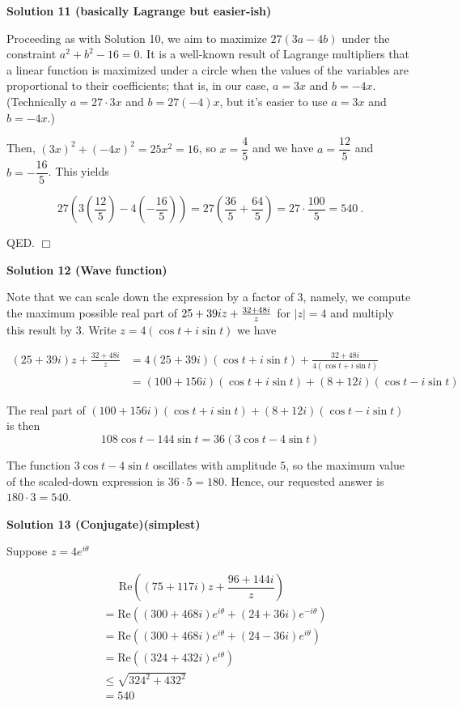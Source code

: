 \begin{enumerate}
 



\textbf{Solution 11 (basically Lagrange but easier-ish)}

Proceeding as with Solution 10, we aim to maximize $27(3a-4b)$ under the constraint $a^2+b^2-16=0$. It is a well-known result of Lagrange multipliers that a linear function is maximized under a circle when the values of the variables are proportional to their coefficients; that is, in our case, $a=3x$ and $b=-4x$. (Technically $a=27\cdot3x$ and $b=27(-4)x$, but it's easier to use $a=3x$ and $b=-4x$.) 

 Then, $(3x)^2+(-4x)^2=25x^2=16$, so $x=\dfrac45$ and we have $a=\dfrac{12}5$ and $b=-\dfrac{16}5$. This yields 

 
 \[27\left(3\left(\dfrac{12}5\right)-4\left(-\dfrac{16}5\right)\right)=27\left(\dfrac{36}5+\dfrac{64}5\right)=27\cdot\dfrac{100}5=\boxed{540}~.\] 

 QED. $\Box$




\textbf{Solution 12 (Wave function)}

Note that we can scale down the expression by a factor of $3$, namely, we compute the maximum possible real part of ${25+39i}z+{32+48i\over z}$ for $|z|=4$ and multiply this result by 3. Write $z=4(\cos t+i\sin t)$ we have

 \begin{align}(25+39i)z + \frac{32+48i}{z}&= 4(25+39i)(\cos t+i\sin t) + \frac{32+48i}{4(\cos t+i\sin t)} \\&= (100+156i)(\cos t+i\sin t) + (8+12i)(\cos t-i\sin t)\end{align}

 The real part of $(100+156i)(\cos t+i\sin t)+(8+12i)(\cos t-i\sin t)$ is then 
 \[108\cos t-144\sin t=36(3\cos t-4\sin t)\]

 The function $3\cos t-4\sin t$ oscillates with amplitude $5$, so the maximum value of the scaled-down expression is $36\cdot 5=180$. Hence, our requested answer is $180\cdot 3=\boxed{540}$.

 



\textbf{Solution 13 (Conjugate)(simplest)}

Suppose $z = 4e^{i\theta}$

 \begin{align}& \phantom{\text{ = }}\mathrm{Re}\left((75 + 117i)z + \dfrac{96 + 144i}{z}\right)\\& = \mathrm{Re}\left((300 + 468i)e^{i\theta} + (24 + 36i)e^{-i\theta}\right)\\& = \mathrm{Re}\left((300 + 468i)e^{i\theta} + (24 - 36i)e^{i\theta}\right)\\& = \mathrm{Re}\left((324 + 432i)e^{i\theta}\right)\\& \leq \sqrt{324^2 + 432^2}\\& = \boxed{540}\end{align}


\end{enumerate}

